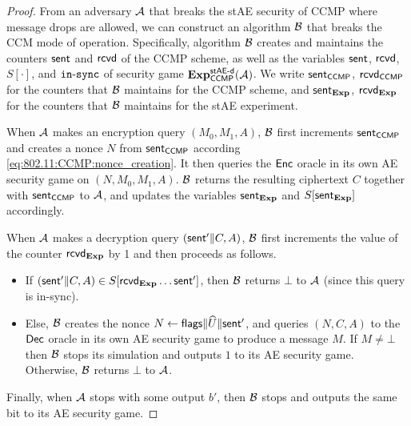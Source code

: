 \begin{proof}
From an adversary $\A$ that breaks the stAE security of CCMP where message drops are allowed,
we can construct an algorithm $\A[B]$ that breaks the CCM mode of operation.
Specifically,
algorithm $\A[B]$ creates and maintains the counters $\sent$ and $\received$ of the CCMP scheme,
as well as the variables $\sent$, $\received$, $S[\cdot]$, and $\phase$ of security game $\Exp_{\ccmp}^{\staesecd}(\A)$.
We write $\sent_\ccmp$, $\received_\ccmp$ for the counters that $\A[B]$ maintains for the CCMP scheme,
and $\sent_\Exp$, $\received_\Exp$ for the counters that $\A[B]$ maintains for the stAE experiment.


When $\A$ makes an encryption query $(M_0, M_1, A)$,
$\A[B]$ first increments $\sent_\ccmp$ and creates a nonce $N$ from $\sent_\ccmp$ according \cref{eq:802.11:CCMP:nonce_creation}.
It then queries the $\enc$ oracle in its own AE security game on $(N, M_0, M_1, A)$.
$\A[B]$ returns the resulting ciphertext $C$ together with $\sent_\ccmp$ to $\A$,
and updates the variables $\sent_\Exp$ and $S[\sent_\Exp]$ accordingly.

When $\A$ makes a decryption query $(\sent' \concat C, A)$,
$\A[B]$ first increments the value of the counter $\received_\Exp$ by 1 and then proceeds as follows.
\begin{itemize}
	\item If $(\sent' \concat C, A) \in S[\received_\Exp \dotso \sent']$,
	then $\A[B]$
	returns $\bot$ to $\A$
	(since this query is in-sync).
	
	
	\item Else,
	$\A[B]$ creates the nonce $N \gets \flags \concat \widehat{U} \concat \sent'$,
	and queries $(N, C, A)$ to the $\dec$ oracle in its own AE security game to produce a message $M$.
	If $M \neq \bot$ then $\A[B]$ stops its simulation and outputs $1$ to its AE security game.
	Otherwise,
	$\A[B]$ returns $\bot$ to $\A$. 
	
\end{itemize}

Finally,
when $\A$ stops with some output $b'$,
then $\A[B]$ stops and outputs the same bit to its AE security game.



\end{proof}
